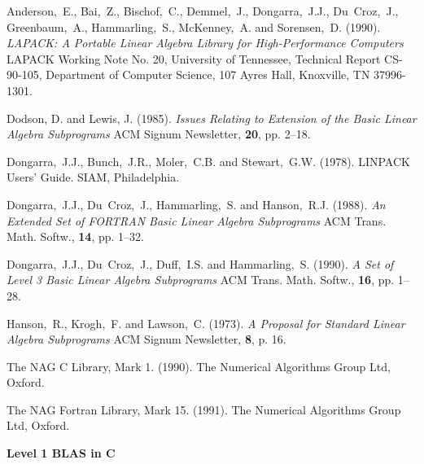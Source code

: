 \begin{thebibliography}{8}
Anderson,~E., Bai,~Z., Bischof,~C., Demmel,~J., Dongarra,~J.J., Du~Croz,~J., 
Greenbaum,~A., Hammarling,~S., McKenney,~A. and Sorensen,~D. (1990).
{\it LAPACK: A Portable Linear Algebra Library for High-Performance 
Computers} 
LAPACK Working Note No. 20,
University of Tennessee, Technical Report CS-90-105, Department of 
Computer Science, 107 Ayres Hall, Knoxville, TN 37996-1301.

Dodson, D. and Lewis, J. (1985).
{\it Issues Relating to Extension of the Basic Linear Algebra Subprograms}
ACM Signum Newsletter, {\bf 20}, pp. 2--18.

Dongarra,~J.J., Bunch,~J.R., Moler,~C.B. and Stewart,~G.W. (1978).
LINPACK Users' Guide. SIAM, Philadelphia.

Dongarra,~J.J., Du~Croz,~J., Hammarling,~S. and Hanson,~R.J. (1988).
{\it An Extended Set of FORTRAN Basic Linear Algebra Subprograms}
ACM Trans. Math. Softw., {\bf 14}, pp. 1--32.

Dongarra,~J.J., Du~Croz,~J., Duff,~I.S. and Hammarling,~S. (1990).
{\it A Set of Level 3 Basic Linear Algebra Subprograms} 
ACM Trans. Math. Softw., {\bf 16}, pp. 1--28.

Hanson,~R., Krogh,~F. and Lawson,~C. (1973).
{\it A Proposal for Standard Linear Algebra Subprograms}
ACM Signum Newsletter, {\bf 8}, p. 16.

The NAG C Library, Mark 1. (1990).
The Numerical Algorithms Group Ltd, Oxford.

The NAG Fortran Library, Mark 15. (1991).
The Numerical Algorithms Group Ltd, Oxford.
\end{thebibliography}

\newpage
\noindent
{\large {\bf Level 1 BLAS in C}}

